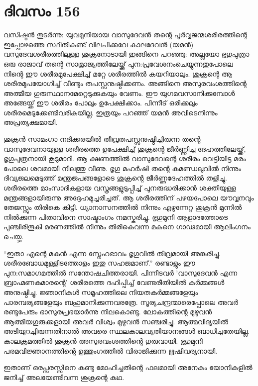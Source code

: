 \section{ദിവസം 156}


വസിഷ്ഠൻ തുടർന്നു: യുവമുനിയായ വാസുദേവൻ തന്റെ പൂർവ്വജന്മശരീരത്തിന്റെ ഇപ്പോഴത്തെ സ്ഥിതികണ്ട് വിലപിക്കവേ കാലദേവൻ (യമൻ) വസുദേവശരീരത്തിലുള്ള ശുക്രനോടായി ഇങ്ങിനെ പറഞ്ഞു: അല്ലയോ ഭൃഗുപുത്രാ ഒരു രാജാവ് തന്റെ സാമ്രാജ്യത്തിലേയ്ക്ക് പുന:പ്രവേശനംചെയ്യുന്നതുപോലെ നിന്റെ ഈ ശരീരമുപേക്ഷിച്ച് മറ്റേ ശരീരത്തിൽ കയറിയാലും. ശുക്രന്റെ ആ ശരീരമുപയോഗിച്ച് വീണ്ടും തപസ്സനുഷ്ഠിക്കണം. അങ്ങിനെ അസുരവംശത്തിന്റെ അത്മീയ ഗുരുസ്ഥാനമേറ്റെടുക്കുകയും വേണം. ഈ യുഗമവസാനിക്കുമ്പോൾ അങ്ങേയ്ക്ക് ഈ ശരീരം പോലും ഉപേക്ഷിക്കാം. പിന്നീട് ഒരിക്കലും ശരീരമെടുക്കേണ്ടിവരികയില്ല. ഇത്രയും പറഞ്ഞ് യമൻ അവിടെനിന്നും അപ്രത്യക്ഷമായി.

ശുക്രൻ സാമംഗാ നദിക്കരയിൽ തീവ്രതപസ്സനുഷ്ഠിച്ചിരുന്ന തന്റെ വാസുദേവനായുള്ള ശരീരത്തെ ഉപേക്ഷിച്ച് ശുക്രന്റെ ജീർണ്ണിച്ച ദേഹത്തിലേയ്ക്ക്, ഭൃഗുപുത്രനായി കൂടുമാറി. ആ ക്ഷണത്തിൽ വാസുദേവന്റെ ശരീരം വെട്ടിയിട്ട മരം പോലെ ശവമായി നിലത്തു വീണു. ഭൃഗു മഹർഷി തന്റെ കമണ്ഡലുവിൽ നിന്നും ദിവ്യജലമെടുത്ത് മന്ത്രജപങ്ങളോടെ ശുക്രന്റെ ജീർണ്ണദേഹത്തിൽ തളിച്ചു. ശരീരത്തെ മാംസാദികളായ വസ്ത്രങ്ങളുടുപ്പിച്ച് പുനരുദ്ധരിക്കാൻ ശക്തിയുള്ള മന്ത്രങ്ങളായിരുന്നു അദ്ദേഹമുച്ചരിച്ചത്. ആ ശരീരത്തിന്‌ പഴയപോലെ യൗവ്വനവും തേജസ്സും തിരികെ കിട്ടി. ധ്യാനാസനത്തിൽ നിന്നും എഴുന്നേറ്റ ശുക്രൻ മുന്നിൽ നിൽക്കുന്ന പിതാവിനെ സാഷ്ടാംഗം നമസ്കരിച്ചു. ഭൃഗുമുനി ആളാദത്തോടെ പുഞ്ചിരിതൂകി മരണത്തിൽ നിന്നും തിരികെവന്ന മകനെ ഗാഢമായി ആലിംഗനം ചെയ്തു.

“ഇതാ എന്റെ മകൻ എന്ന സ്നേഹഭാവം ഭൃഗുവിൽ തീവ്രമായി അങ്കുരിച്ചു. ശരീരബോധമുള്ളിടത്തോളം ഇതു സഹജമാണ്‌.” രണ്ടാളും ഈ പുന:സമാഗമത്തിൽ സന്തോഷചിത്തരായി. പിന്നീടവർ 'വാസുദേവൻ എന്ന ബ്രാഹ്മണകുമാരന്റെ' ശരീരത്തെ ദഹിപ്പിച്ച് വേണ്ടരീതിയിൽ കർമ്മങ്ങൾ അനുഷ്ഠിച്ചു. ജ്ഞാനികൾ സമൂഹത്തിലെ നിയതകർമ്മങ്ങളേയും പാരമ്പര്യങ്ങളേയും ബഹുമാനിക്കുന്നവരത്രേ. സൂര്യചന്ദ്രന്മാരെപ്പോലെ അവര്‍ രണ്ടുപേരും ഭാസുരപ്രഭയാർന്നു നിലകൊണ്ടു. ലോകത്തിന്റെ മുഴുവൻ ആത്മീയഗുരുക്കളായി അവർ വിശ്വം മുഴുവൻ സഞ്ചരിച്ചു. ആത്മവിദ്യയിൽ അടിയുറച്ചിരുന്നതിനാൽ അവരെ സ്ഥലകാലവ്യതിയാനങ്ങൾ ബാധിച്ചതേയില്ല. കാലക്രമത്തിൽ ശുക്രൻ അസുരവംശത്തിന്റെ ഗുരുവായി. ഭൃഗുമുനി പരമവിജ്ഞാനത്തിന്റെ ഉത്തുംഗത്തിൽ വിരാജിക്കുന്ന ഋഷിവര്യനായി.

ഇതാണ്‌ ഒരപ്സരസ്സിനെ കണ്ടു മോഹിച്ചതിന്റെ ഫലമായി അനേകം യോനികളിൽ ജനിച്ച് അലയേണ്ടിവന്ന ശുക്രന്റെ കഥ. 
